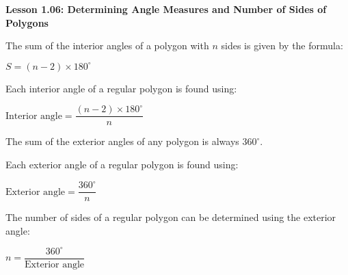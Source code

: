 \begin{center}
\textbf{Lesson 1.06: Determining Angle Measures and Number of Sides of Polygons}
\end{center}

\vspace*{-1.5ex}

\noindent The sum of the interior angles of a polygon with \( n \) sides is given by the formula:

{\centering $
     S = (n-2) \times 180^\circ
 $\par}

\noindent Each interior angle of a regular polygon is found using:

{\centering $
    \text{Interior angle} = \dfrac{(n-2) \times 180^\circ}{n}
$\par}

\noindent  The sum of the exterior angles of any polygon is always \( 360^\circ \).

\noindent Each exterior angle of a regular polygon is found using:

{\centering $
    \text{Exterior angle} = \dfrac{360^\circ}{n}
$\par}

\noindent  The number of sides of a regular polygon can be determined using the exterior angle:
{\centering $ n = \dfrac{360^\circ}{\text{Exterior angle}} $\par}
